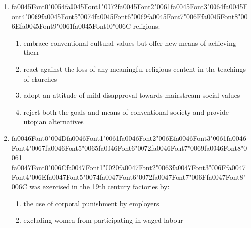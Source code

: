 \documentclass[12pt]{article}
\begin{document}
\begin{enumerate}[label=\arabic*.]
\begin{enumerate}[label=(\alph*)]
    \item charismatic authority
    \item rational-legal authority
    \item traditional authority
    \item value-rational authority
\end{enumerate}
\item {\csname fa0045Font0\endcsname\char"0054}{\csname fa0045Font1\endcsname\char"0072}{\csname fa0045Font2\endcsname\char"0061}{\csname fa0045Font3\endcsname\char"0064}{\csname fa0045Font4\endcsname\char"0069}{\csname fa0045Font5\endcsname\char"0074}{\csname fa0045Font6\endcsname\char"0069}{\csname fa0045Font7\endcsname\char"006F}{\csname fa0045Font8\endcsname\char"006E}{\csname fa0045Font9\endcsname\char"0061}{\csname fa0045Font10\endcsname\char"006C} religions:
\begin{enumerate}[label=(\alph*)]
    \item embrace conventional cultural values but offer new means of achieving them
    \item react against the loss of any meaningful religious content in the teachings of churches
    \item adopt an attitude of mild disapproval towards mainstream social values
    \item reject both the goals and means of conventional society and provide utopian alternatives
\end{enumerate}
\item {\csname fa0046Font0\endcsname\char"004D}{\csname fa0046Font1\endcsname\char"0061}{\csname fa0046Font2\endcsname\char"006E}{\csname fa0046Font3\endcsname\char"0061}{\csname fa0046Font4\endcsname\char"0067}{\csname fa0046Font5\endcsname\char"0065}{\csname fa0046Font6\endcsname\char"0072}{\csname fa0046Font7\endcsname\char"0069}{\csname fa0046Font8\endcsname\char"0061} {\csname fa0047Font0\endcsname\char"006C}{\csname fa0047Font1\endcsname\char"0020}{\csname fa0047Font2\endcsname\char"0063}{\csname fa0047Font3\endcsname\char"006F}{\csname fa0047Font4\endcsname\char"006E}{\csname fa0047Font5\endcsname\char"0074}{\csname fa0047Font6\endcsname\char"0072}{\csname fa0047Font7\endcsname\char"006F}{\csname fa0047Font8\endcsname\char"006C} was exercised in the 19th century factories by:
\begin{enumerate}[label=(\alph*)]
    \item the use of corporal punishment by employers
    \item excluding women from participating in waged labour

\end{enumerate}
\end{enumerate}
\end{document}
